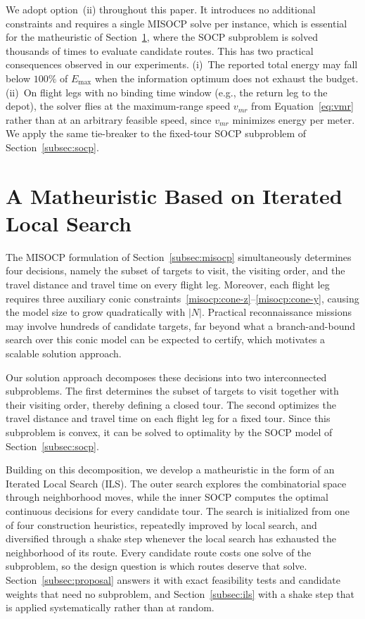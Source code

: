 \documentclass[11pt]{article}
\begin{document}
We adopt option~(ii) throughout this paper. It introduces no additional constraints and requires a single MISOCP solve per instance, which is essential for the matheuristic of Section~\ref{sec:heuristic}, where the SOCP subproblem is solved thousands of times to evaluate candidate routes. This has two practical consequences observed in our experiments. (i)~The reported total energy may fall below $100\%$ of $E_{\max}$ when the information optimum does not exhaust the budget. (ii)~On flight legs with no binding time window (e.g., the return leg to the depot), the solver flies at the maximum-range speed $v_{mr}$ from Equation~\eqref{eq:vmr} rather than at an arbitrary feasible speed, since $v_{mr}$ minimizes energy per meter. We apply the same tie-breaker to the fixed-tour SOCP subproblem of Section~\ref{subsec:socp}.

\section{A Matheuristic Based on Iterated Local Search}\label{sec:heuristic}

The MISOCP formulation of Section~\ref{subsec:misocp} simultaneously determines four decisions, namely the subset of targets to visit, the visiting order, and the travel distance and travel time on every flight leg. Moreover, each flight leg requires three auxiliary conic constraints~\eqref{misocp:cone-z}--\eqref{misocp:cone-y}, causing the model size to grow quadratically with $|N|$. Practical reconnaissance missions may involve hundreds of candidate targets, far beyond what a branch-and-bound search over this conic model can be expected to certify, which motivates a scalable solution approach.

Our solution approach decomposes these decisions into two interconnected subproblems. The first determines the subset of targets to visit together with their visiting order, thereby defining a closed tour. The second optimizes the travel distance and travel time on each flight leg for a fixed tour. Since this subproblem is convex, it can be solved to optimality by the SOCP model of Section~\ref{subsec:socp}.

Building on this decomposition, we develop a matheuristic in the form of an Iterated Local Search (ILS). The outer search explores the combinatorial space through neighborhood moves, while the inner SOCP computes the optimal continuous decisions for every candidate tour. The search is initialized from one of four construction heuristics, repeatedly improved by local search, and diversified through a shake step whenever the local search has exhausted the neighborhood of its route. Every candidate route costs one solve of the subproblem, so the design question is which routes deserve that solve. Section~\ref{subsec:proposal} answers it with exact feasibility tests and candidate weights that need no subproblem, and Section~\ref{subsec:ils} with a shake step that is applied systematically rather than at random.
\end{document}
